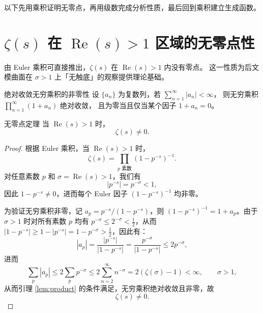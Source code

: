 \vspace{0.4em}
\noindent
以下先用乘积证明无零点，再用级数完成分析性质，最后回到乘积建立生成函数。

\section{\texorpdfstring{$\zeta(s)$}{Zeta(s)} 在 \texorpdfstring{$\operatorname{Re}(s) > 1$}{Re(s) > 1} 区域的无零点性}

由 Euler 乘积可直接推出，$\zeta(s)$ 在 $\operatorname{Re}(s) > 1$ 内没有零点。
这一性质为后文模曲面在 $\sigma > 1$ 上「无触底」的观察提供理论基础。

\begin{lemma}{绝对收敛无穷乘积的非零性}{}
\label{lem:product}
设 $\{a_n\}$ 为复数列，若 $\sum_{n=1}^\infty |a_n| < \infty$，
则无穷乘积 $\prod_{n=1}^\infty (1+a_n)$ 绝对收敛，
且为零当且仅当某个因子 $1+a_n = 0$。
\end{lemma}

\begin{theorem}{无零点定理}{}
当 $\operatorname{Re}(s) > 1$ 时，
\[
\zeta(s) \neq 0.
\]
\end{theorem}

\begin{proof}
根据 Euler 乘积，当 $\operatorname{Re}(s) > 1$ 时，
\[
\zeta(s) =\prod_{p \text{ 素数}} (1 - p^{-s})^{-1}.
\]
对任意素数 $p$ 和 $\sigma = \operatorname{Re}(s) > 1$，我们有
\[
|p^{-s}| = p^{-\sigma} < 1,
\]
因此 $1 - p^{-s} \neq 0$，进而每个 Euler 因子 $(1 - p^{-s})^{-1}$ 均非零。

为验证无穷乘积非零，记 $a_p = p^{-s}/(1-p^{-s})$，则 $(1-p^{-s})^{-1}=1+a_p$。由于 $\sigma > 1$ 时对所有素数 $p$ 均有 $p^{-\sigma} \leq 2^{-\sigma} < \frac{1}{2}$，从而 $|1-p^{-s}| \geq 1 - |p^{-s}| = 1 - p^{-\sigma} > \frac{1}{2}$，因此有：
\begin{equation}
|a_p| = \frac{|p^{-s}|}{|1-p^{-s}|} = \frac{p^{-\sigma}}{|1-p^{-s}|} \leq 2 p^{-\sigma},
\end{equation}
进而
\begin{equation}\sum_p |a_p|
    \leq 2 \sum_p p^{-\sigma}
    \leq 2 \sum_{n=2}^\infty n^{-\sigma}
    = 2(\zeta(\sigma) - 1) < \infty,
    \qquad \sigma > 1,
\end{equation}
从而引理 \ref{lem:product} 的条件满足，无穷乘积绝对收敛且非零，故
\[
\zeta(s) \neq 0.
\]
\end{proof}


